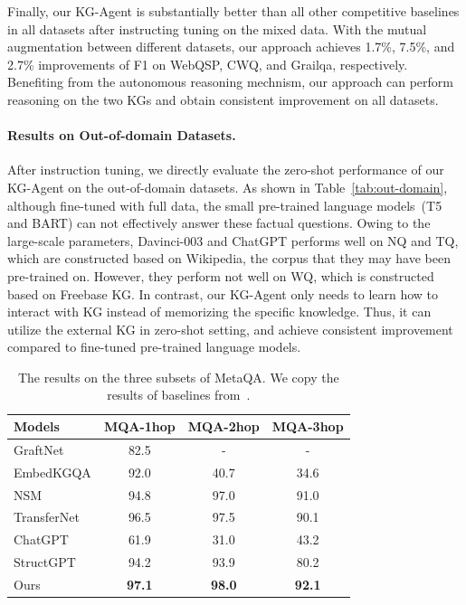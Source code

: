 Finally, our KG-Agent is substantially better than all other competitive baselines in all datasets after instructing tuning on the mixed data. With the mutual augmentation between different datasets, our approach achieves 1.7\%, 7.5\%, and 2.7\% improvements of F1 on WebQSP, CWQ, and Grailqa, respectively. 
Benefiting from the autonomous reasoning mechnism, our approach can perform reasoning on the two KGs and obtain consistent improvement on all datasets.



\paragraph{Results on Out-of-domain Datasets.}
After instruction tuning, we directly evaluate the zero-shot performance of our KG-Agent on the out-of-domain datasets. As shown in Table~\ref{tab:out-domain}, although fine-tuned with full data, the small pre-trained language models~(\eg T5 and BART) can not effectively answer these factual questions. Owing to the large-scale parameters, Davinci-003 and ChatGPT performs well on NQ and TQ, which are constructed based on Wikipedia, the corpus that they may have been pre-trained on.
However, they perform not well on WQ, which is constructed based on Freebase KG.
In contrast, our KG-Agent only needs to learn how to interact with KG instead of memorizing the specific knowledge. Thus, it can utilize the external KG in zero-shot setting, and achieve consistent improvement compared to fine-tuned pre-trained language models.
\begin{table}[t]
    \renewcommand\arraystretch{1}
    \setlength\tabcolsep{4.3pt}
	\centering
	\small
            \begin{tabular}{l  c  c c }
			\toprule
			\textbf{Models} & \textbf{MQA-1hop} & \textbf{MQA-2hop} & \textbf{MQA-3hop} \\
			\midrule
			GraftNet & 82.5    & -  &  -  \\
			EmbedKGQA & 92.0    & 40.7  &  34.6  \\
			  NSM & 94.8  &   97.0    & 91.0 \\
                TransferNet & 96.5    & 97.5  &  90.1 \\
                \midrule
			ChatGPT & 61.9 & 31.0 & 43.2\\
			StructGPT  & 94.2 & 93.9 & 80.2  \\
                \midrule
                Ours & \textbf{97.1} & \textbf{98.0} & \textbf{92.1} \\
    		\bottomrule
		\end{tabular}
        \caption{The results on the three subsets of MetaQA. We copy the results of baselines from~\citet{Jiang-2023-arxiv-StructGPT}.}%
	\label{tab:res-metaqa}
\end{table}
